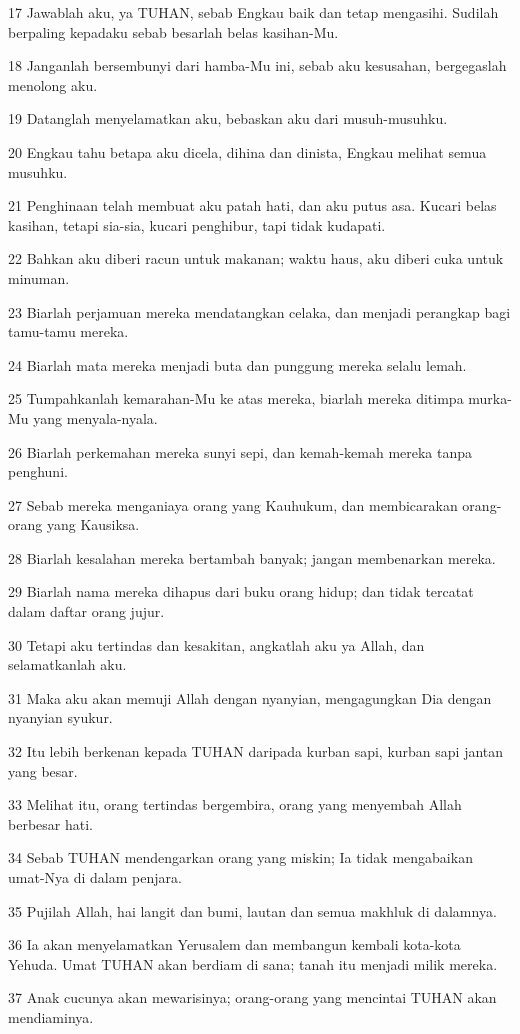 \par 17 Jawablah aku, ya TUHAN, sebab Engkau baik dan tetap mengasihi. Sudilah berpaling kepadaku sebab besarlah belas kasihan-Mu.
\par 18 Janganlah bersembunyi dari hamba-Mu ini, sebab aku kesusahan, bergegaslah menolong aku.
\par 19 Datanglah menyelamatkan aku, bebaskan aku dari musuh-musuhku.
\par 20 Engkau tahu betapa aku dicela, dihina dan dinista, Engkau melihat semua musuhku.
\par 21 Penghinaan telah membuat aku patah hati, dan aku putus asa. Kucari belas kasihan, tetapi sia-sia, kucari penghibur, tapi tidak kudapati.
\par 22 Bahkan aku diberi racun untuk makanan; waktu haus, aku diberi cuka untuk minuman.
\par 23 Biarlah perjamuan mereka mendatangkan celaka, dan menjadi perangkap bagi tamu-tamu mereka.
\par 24 Biarlah mata mereka menjadi buta dan punggung mereka selalu lemah.
\par 25 Tumpahkanlah kemarahan-Mu ke atas mereka, biarlah mereka ditimpa murka-Mu yang menyala-nyala.
\par 26 Biarlah perkemahan mereka sunyi sepi, dan kemah-kemah mereka tanpa penghuni.
\par 27 Sebab mereka menganiaya orang yang Kauhukum, dan membicarakan orang-orang yang Kausiksa.
\par 28 Biarlah kesalahan mereka bertambah banyak; jangan membenarkan mereka.
\par 29 Biarlah nama mereka dihapus dari buku orang hidup; dan tidak tercatat dalam daftar orang jujur.
\par 30 Tetapi aku tertindas dan kesakitan, angkatlah aku ya Allah, dan selamatkanlah aku.
\par 31 Maka aku akan memuji Allah dengan nyanyian, mengagungkan Dia dengan nyanyian syukur.
\par 32 Itu lebih berkenan kepada TUHAN daripada kurban sapi, kurban sapi jantan yang besar.
\par 33 Melihat itu, orang tertindas bergembira, orang yang menyembah Allah berbesar hati.
\par 34 Sebab TUHAN mendengarkan orang yang miskin; Ia tidak mengabaikan umat-Nya di dalam penjara.
\par 35 Pujilah Allah, hai langit dan bumi, lautan dan semua makhluk di dalamnya.
\par 36 Ia akan menyelamatkan Yerusalem dan membangun kembali kota-kota Yehuda. Umat TUHAN akan berdiam di sana; tanah itu menjadi milik mereka.
\par 37 Anak cucunya akan mewarisinya; orang-orang yang mencintai TUHAN akan mendiaminya.

